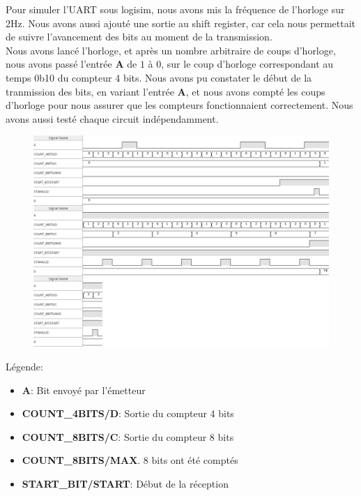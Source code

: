 \documentclass[a4paper]{article} %
\begin{document}
\begin{tcolorbox}[colframe=Monokaimagenta,colback=white]

Pour simuler l'UART sous logisim, nous avons mis la fréquence de l'horloge sur 2Hz. Nous avons aussi ajouté une sortie au shift register, car cela nous permettait de suivre l'avancement des bits au moment de la transmission.\\
Nous avons lancé l'horloge, et après un nombre arbitraire de coups d'horloge, nous avons passé l'entrée \textbf{A} de $1$ à $0$, sur le coup d'horloge correspondant au temps 0b10 du compteur 4 bits. Nous avons pu constater le début de la tranmission des bits, en variant l'entrée \textbf{A}, et nous avons compté les coups d'horloge pour nous assurer que les compteurs fonctionnaient correctement.
Nous avons aussi testé chaque circuit indépendamment.
\\
\begin{figure}[H]
\centering
    \includegraphics[width=1\textwidth]{src/CHRONO_UART_OK.png}
    \label{fig:chronoUART}
\end{figure}
Légende:
\begin{itemize}
    \item     \textbf{A}: Bit envoyé par l'émetteur
    \item     \textbf{COUNT\_4BITS/D}: Sortie du compteur 4 bits
    \item     \textbf{COUNT\_8BITS/C}: Sortie du compteur 8 bits
    \item     \textbf{COUNT\_8BITS/MAX}. 8 bits ont été comptés
    \item     \textbf{START\_BIT/START}: Début de la réception

\end{itemize}
\end{tcolorbox}
\end{document}
